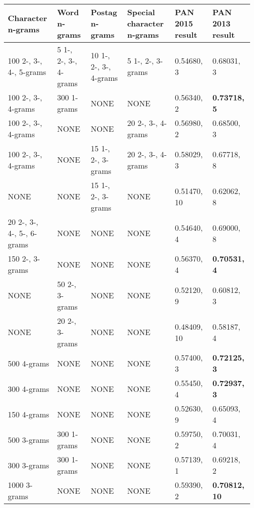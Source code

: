\begin{landscape}
\begin{table}
    \small
    \centering
    \begin{tabular}{llll|ll}
        \textbf{Character n-grams} & \textbf{Word n-grams} &
        \textbf{Postag n-grams} & \textbf{Special character n-grams} &
        \textbf{PAN 2015 result} & \textbf{PAN 2013 result} \\
        \hline
        100 2-, 3-, 4-, 5-grams & 5 1-, 2-, 3-, 4-grams &
        10 1-, 2-, 3-, 4-grams & 5 1-, 2-, 3-grams & 0.54680, 3 & 0.68031, 3 \\
        100 2-, 3-, 4-grams & 300 1-grams & NONE & NONE & 0.56340, 2 &
        \textbf{0.73718, 5} \\
        100 2-, 3-, 4-grams & NONE & NONE & 20 2-, 3-, 4-grams &
        0.56980, 2 & 0.68500, 3 \\
        100 2-, 3-, 4-grams & NONE & 15 1-, 2-, 3-grams & 20 2-, 3-, 4-grams &
        0.58029, 3 & 0.67718, 8 \\
        NONE & NONE & 15 1-, 2-, 3-grams & NONE & 0.51470, 10 & 0.62062, 8 \\
        20 2-, 3-, 4-, 5-, 6-grams & NONE & NONE & NONE & 0.54640, 4 &
        0.69000, 8 \\
        150 2-, 3-grams & NONE & NONE & NONE & 0.56370, 4 &
        \textbf{0.70531, 4} \\
        NONE & 50 2-, 3-grams & NONE & NONE & 0.52120, 9 & 0.60812, 3 \\
        NONE & 20 2-, 3-grams & NONE & NONE & 0.48409, 10 & 0.58187, 4 \\
        500 4-grams & NONE & NONE & NONE & 0.57400, 3 & \textbf{0.72125, 3} \\
        300 4-grams & NONE & NONE & NONE & 0.55450, 4 & \textbf{0.72937, 3} \\
        150 4-grams & NONE & NONE & NONE & 0.52630, 9 & 0.65093, 4 \\
        500 3-grams & 300 1-grams & NONE & NONE & 0.59750, 2 & 0.70031, 4 \\
        300 3-grams & 300 1-grams & NONE & NONE & 0.57139, 1 & 0.69218, 2 \\
        1000 3-grams & NONE & NONE & NONE & 0.59390, 2 & \textbf{0.70812, 10} \\

\end{tabular}
\end{table}
\end{landscape}
